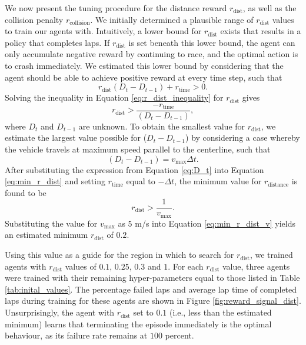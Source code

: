 We now present the tuning procedure for the distance reward $r_{\text{dist}}$, as well as the collision penalty $r_{\text{collision}}$.
We initially determined a plausible range of $r_{\text{dist}}$ values to train our agents with.
Intuitively, a lower bound for $r_{\text{dist}}$ exists that results in a policy that completes laps.
If $r_{\text{dist}}$ is set beneath this lower bound, the agent can only accumulate negative reward by continuing to race, and the optimal action is to crash immediately.
We estimated this lower bound by considering that the agent should be able to achieve positive reward at every time step, such that
\begin{equation}\label{eq:r_dist_inequality}
    r_{\text{dist}}(D_{t} - D_{t-1}) + r_{\text{time}} > 0.
\end{equation}
Solving the inequality in Equation \ref{eq:r_dist_inequality} for $r_{\text{dist}}$ gives
\begin{equation}
    r_{\text{dist}} > \frac{-r_{\text{time}}}{(D_t-D_{t-1})},
\label{eq:min_r_dist}
\end{equation}
where $D_{t}$ and $D_{t-1}$ are unknown.
To obtain the smallest value for $r_{\text{dist}}$, we estimate the largest value possible for ($D_{t}-D_{t-1}$) by considering a case whereby the vehicle  travels at maximum speed parallel to the centerline, such that
\begin{equation}\label{eq:D_t}
    (D_t - D_{t-1}) = v_{\text{max}} \Delta t.
\end{equation}
After substituting the expression from Equation \ref{eq:D_t} into Equation \ref{eq:min_r_dist} and setting $r_{\text{time}}$ equal to $-\Delta t$, 
the minimum value for $r_{\text{distance}}$ is found to be
\begin{equation}\label{eq:min_r_dist_v}
    r_{\text{dist}} > \frac{1}{v_{\text{max}}}.
\end{equation}
Substituting the value for $v_{\text{max}}$ as $5$ m/s into Equation \ref{eq:min_r_dist_v} yields an estimated minimum $r_{\text{dist}}$ of $0.2$.


Using this value as a guide for the region in which to search for  $r_{\text{dist}}$, we trained agents with $r_{\text{dist}}$ values of $0.1$, $0.25$, $0.3$ and $1$. 
For each $r_{\text{dist}}$ value, three agents were trained with their remaining hyper-parameters equal to those listed in Table \ref{tab:inital_values}.
The percentage failed laps and average lap time of completed laps during training for these agents are shown in Figure \ref{fig:reward_signal_dist}.
Unsurprisingly, the agent with $r_{\text{dist}}$ set to $0.1$ (i.e., less than the estimated minimum) learns that terminating the episode immediately is the optimal behaviour, as its failure rate remains at $100$ percent.

